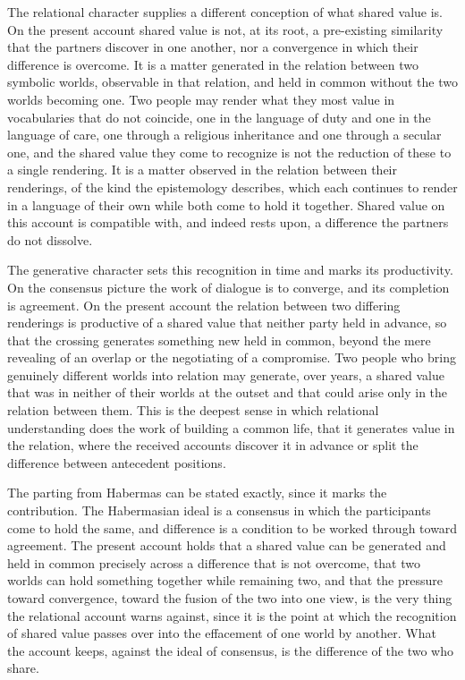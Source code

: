 The relational character supplies a different conception of what shared value is. On the present account shared value is not, at its root, a pre-existing similarity that the partners discover in one another, nor a convergence in which their difference is overcome. It is a matter generated in the relation between two symbolic worlds, observable in that relation, and held in common without the two worlds becoming one. Two people may render what they most value in vocabularies that do not coincide, one in the language of duty and one in the language of care, one through a religious inheritance and one through a secular one, and the shared value they come to recognize is not the reduction of these to a single rendering. It is a matter observed in the relation between their renderings, of the kind the epistemology describes, which each continues to render in a language of their own while both come to hold it together. Shared value on this account is compatible with, and indeed rests upon, a difference the partners do not dissolve.

The generative character sets this recognition in time and marks its productivity. On the consensus picture the work of dialogue is to converge, and its completion is agreement. On the present account the relation between two differing renderings is productive of a shared value that neither party held in advance, so that the crossing generates something new held in common, beyond the mere revealing of an overlap or the negotiating of a compromise. Two people who bring genuinely different worlds into relation may generate, over years, a shared value that was in neither of their worlds at the outset and that could arise only in the relation between them. This is the deepest sense in which relational understanding does the work of building a common life, that it generates value in the relation, where the received accounts discover it in advance or split the difference between antecedent positions.

The parting from Habermas can be stated exactly, since it marks the contribution. The Habermasian ideal is a consensus in which the participants come to hold the same, and difference is a condition to be worked through toward agreement. The present account holds that a shared value can be generated and held in common precisely across a difference that is not overcome, that two worlds can hold something together while remaining two, and that the pressure toward convergence, toward the fusion of the two into one view, is the very thing the relational account warns against, since it is the point at which the recognition of shared value passes over into the effacement of one world by another. What the account keeps, against the ideal of consensus, is the difference of the two who share.
